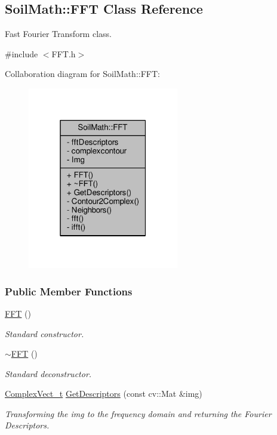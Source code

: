 \hypertarget{class_soil_math_1_1_f_f_t}{}\subsection{Soil\+Math\+:\+:F\+F\+T Class Reference}
\label{class_soil_math_1_1_f_f_t}


Fast Fourier Transform class.  




{\ttfamily \#include $<$F\+F\+T.\+h$>$}



Collaboration diagram for Soil\+Math\+:\+:F\+F\+T\+:
\nopagebreak
\begin{figure}[H]
\begin{center}
\leavevmode
\includegraphics[width=187pt]{class_soil_math_1_1_f_f_t__coll__graph}
\end{center}
\end{figure}
\subsubsection*{Public Member Functions}
\begin{DoxyCompactItemize}
\item 
\hyperlink{class_soil_math_1_1_f_f_t_a52638bf8f971d1448e46b2b6db5f5e8b}{F\+F\+T} ()
\begin{DoxyCompactList}\small\item\em Standard constructor. \end{DoxyCompactList}\item 
\hyperlink{class_soil_math_1_1_f_f_t_a279862b286d865ebc5aa707f94f19d73}{$\sim$\+F\+F\+T} ()
\begin{DoxyCompactList}\small\item\em Standard deconstructor. \end{DoxyCompactList}\item 
\hyperlink{_soil_math_types_8h_a7567e521c2b2c408dcb62dbff72390f7}{Complex\+Vect\+\_\+t} \hyperlink{class_soil_math_1_1_f_f_t_af5fb6f4804079ee184a314e2f0a0f2fc}{Get\+Descriptors} (const cv\+::\+Mat \&img)
\begin{DoxyCompactList}\small\item\em Transforming the img to the frequency domain and returning the Fourier Descriptors. \end{DoxyCompactList}\end{DoxyCompactItemize}
